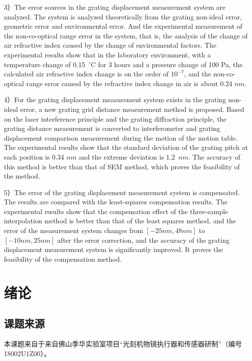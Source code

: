 \documentclass[type=master,oneside]{fduthesis}
\begin{document}
\begin{abstract*}
  3）The error sources in the grating displacement measurement system are analyzed. The system is analyzed theoretically from the grating non-ideal error, geometric error and environmental error. And the experimental measurement of the non-co-optical range error in the system, that is, the analysis of the change of air refractive index caused by the change of environmental factors. The experimental results show that in the laboratory environment, with a temperature change of 0.15 ${ }^{\circ} \mathrm{C}$ for 3 hours and a pressure change of 100 Pa, the calculated air refractive index change is on the order of $10^{-7}$, and the non-co-optical range error caused by the refractive index change in air is about 0.24 $nm$.

  4）For the grating displacement measurement system exists in the grating non-ideal error, a new grating grid distance measurement method is proposed. Based on the laser interference principle and the grating diffraction principle, the grating distance measurement is converted to interferometer and grating displacement comparison measurement during the motion of the motion table. The experimental results show that the standard deviation of the grating pitch at each position is 0.34 $nm$ and the extreme deviation is 1.2 $nm$. The accuracy of this method is better than that of SEM method, which proves the feasibility of the method.

  5）The error of the grating displacement measurement system is compensated. The results are compared with the least-squares compensation results. The experimental results show that the compensation effect of the three-sample interpolation method is better than that of the least squares method, and the error of the measurement system changes from $[-25nm,48nm]$ to $[-10nm,25nm]$ after the error correction, and the accuracy of the grating displacement measurement system is significantly improved. It proves the feasibility of the compensation method.
\end{abstract*}

\mainmatter

\chapter{绪论}
\section{课题来源}
本课题来自于来自佛山季华实验室项目“光刻机物镜执行器和传感器研制”（编号18002U1Z00）。
\end{document}

